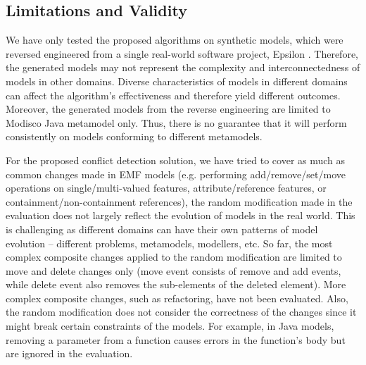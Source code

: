 \subsection{Limitations and Validity}
\label{sec:limitation_and_Threat_to_validity}
We have only tested the proposed algorithms on synthetic models, which were reversed engineered from a single real-world software project, Epsilon \cite{eclipse2018epsilongit}. Therefore, the generated models may not represent the complexity and interconnectedness of models in other domains. Diverse characteristics of models in different domains can affect the algorithm's effectiveness and therefore yield different outcomes. Moreover, the generated models from the reverse engineering are limited to Modisco Java \cite{eclipse2018modiscojava} metamodel only. Thus, there is no guarantee that it will perform consistently on models conforming to different metamodels.

For the proposed conflict detection solution, we have tried to cover as much as common changes made in EMF models (e.g. performing \textsf{add}/\textsf{remove}/\textsf{set}/\textsf{move} operations on \textsf{single}/\textsf{multi}-\textsf{valued} features, \textsf{attribute}/\textsf{reference} features, or \textsf{containment}/\textsf{non}-\textsf{containment} references), the random modification made in the evaluation does not largely reflect the evolution of models in the real world. This is challenging as different domains can have their own patterns of model evolution -- different problems, metamodels, modellers, etc. So far, the most complex composite changes applied to the random modification are limited to \textsf{move} and \textsf{delete} changes only (\textsf{move} event consists of \textsf{remove} and \textsf{add} events, while \textsf{delete} event also removes the sub-elements of the deleted element). More complex composite changes, such as refactoring, have not been evaluated. Also, the random modification does not consider the correctness of the changes since it might break certain constraints of the models. For example, in Java \cite{eclipse2018modiscojava} models, removing a parameter from a function causes errors in the function's body but are ignored in the evaluation. 

